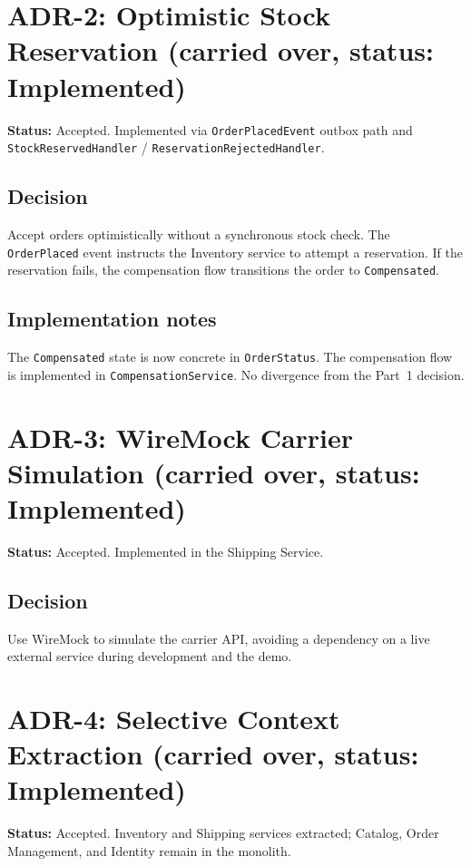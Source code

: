 \section*{ADR-2: Optimistic Stock Reservation (carried over, status: Implemented)}

\textbf{Status:} Accepted. Implemented via \texttt{OrderPlacedEvent} outbox path and \texttt{StockReservedHandler} / \texttt{ReservationRejectedHandler}.

\subsection*{Decision}
Accept orders optimistically without a synchronous stock check. The \texttt{OrderPlaced} event instructs the Inventory service to attempt a reservation. If the reservation fails, the compensation flow transitions the order to \texttt{Compensated}.

\subsection*{Implementation notes}
The \texttt{Compensated} state is now concrete in \texttt{OrderStatus}. The compensation flow is implemented in \texttt{CompensationService}. No divergence from the Part~1 decision.

\section*{ADR-3: WireMock Carrier Simulation (carried over, status: Implemented)}

\textbf{Status:} Accepted. Implemented in the Shipping Service.

\subsection*{Decision}
Use WireMock to simulate the carrier API, avoiding a dependency on a live external service during development and the demo.

\section*{ADR-4: Selective Context Extraction (carried over, status: Implemented)}

\textbf{Status:} Accepted. Inventory and Shipping services extracted; Catalog, Order Management, and Identity remain in the monolith.


